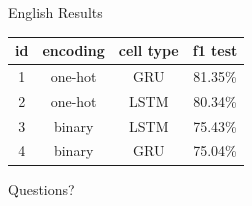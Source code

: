 \documentclass[10pt]{beamer}
\begin{document}
\begin{frame}[fragile]{English Results}
\begin{center}
 \begin{tabular}{c c c c} 
     \toprule
     \textbf{id} & \textbf{encoding } & \textbf{cell type} & \textbf{f1 test}\\
     \midrule
     1 & one-hot & GRU  & 81.35\%\\ %
     2 & one-hot & LSTM & 80.34\%\\ %
     3 & binary  & LSTM & 75.43\%\\ %
     4 & binary  & GRU  & 75.04\%\\ %

     \bottomrule
 \end{tabular}
\end{center}

\end{frame}







{
\begin{frame}[standout]
  Questions?
\end{frame}
}
\end{document}
